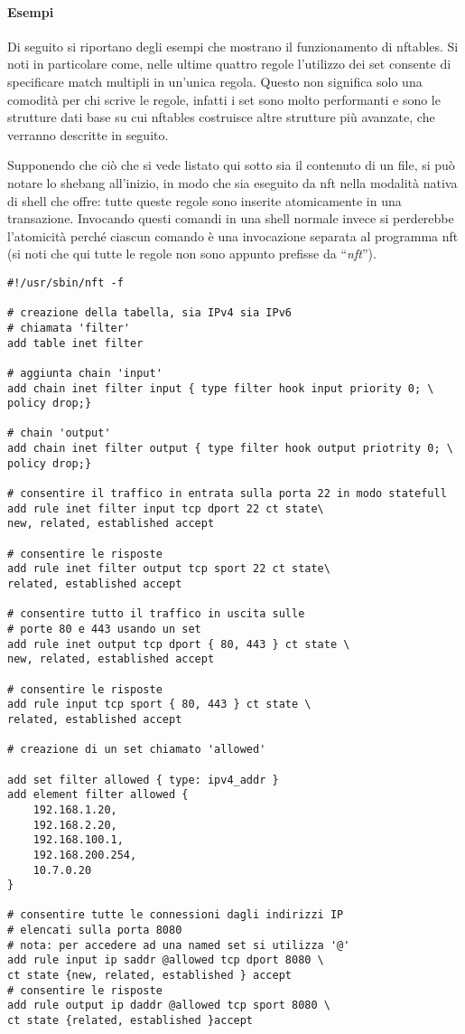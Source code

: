 \paragraph{Esempi}
Di seguito si riportano degli esempi che mostrano il funzionamento di nftables.
Si noti in particolare come, nelle ultime quattro regole l'utilizzo dei set
consente di specificare match multipli in un'unica regola. Questo non significa
solo una comodità per chi scrive le regole, infatti i set sono molto performanti
e sono le strutture dati base su cui nftables costruisce altre strutture
più avanzate, che verranno descritte in seguito.

Supponendo che ciò che si vede listato qui sotto sia il contenuto di un file,
si può notare lo shebang all'inizio, in modo che sia eseguito da nft nella
modalità nativa di shell che offre: tutte queste regole sono inserite atomicamente
in una transazione. Invocando questi comandi in una shell normale invece si
perderebbe l'atomicità perché ciascun comando è una invocazione separata al programma nft
(si noti che qui tutte le regole non sono appunto prefisse da ``\textit{nft}'').
\begin{verbatim}
#!/usr/sbin/nft -f
	
# creazione della tabella, sia IPv4 sia IPv6
# chiamata 'filter'
add table inet filter
	
# aggiunta chain 'input'
add chain inet filter input { type filter hook input priority 0; \
policy drop;}
	
# chain 'output'
add chain inet filter output { type filter hook output priotrity 0; \
policy drop;}
	
# consentire il traffico in entrata sulla porta 22 in modo statefull
add rule inet filter input tcp dport 22 ct state\
new, related, established accept
	
# consentire le risposte
add rule inet filter output tcp sport 22 ct state\
related, established accept
	
# consentire tutto il traffico in uscita sulle
# porte 80 e 443 usando un set
add rule inet output tcp dport { 80, 443 } ct state \
new, related, established accept
	
# consentire le risposte
add rule input tcp sport { 80, 443 } ct state \
related, established accept
	
# creazione di un set chiamato 'allowed'
	
add set filter allowed { type: ipv4_addr }
add element filter allowed {
	192.168.1.20,
	192.168.2.20,
	192.168.100.1,
	192.168.200.254,
	10.7.0.20
}
	
# consentire tutte le connessioni dagli indirizzi IP
# elencati sulla porta 8080
# nota: per accedere ad una named set si utilizza '@'
add rule input ip saddr @allowed tcp dport 8080 \
ct state {new, related, established } accept
# consentire le risposte
add rule output ip daddr @allowed tcp sport 8080 \
ct state {related, established }accept
\end{verbatim}
